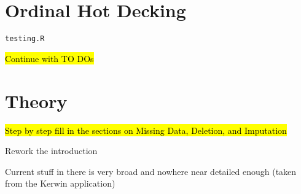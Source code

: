 \section*{Ordinal Hot Decking}
	\begin{coi}
		\item \texttt{testing.R}
			\begin{coi}
				\item \hl{Continue with TO DOs}
			\end{coi}
	\end{coi}

\section*{Theory}
	\begin{coi}
		\item \hl{Step by step fill in the sections on Missing Data, Deletion, and Imputation}
		\item Rework the introduction
			\begin{coi}
				\item Current stuff in there is very broad and nowhere near detailed enough (taken from the Kerwin application)
			\end{coi}
	\end{coi}


			


